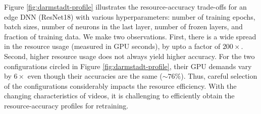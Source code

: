 Figure \ref{fig:darmstadt-profile} illustrates the resource-accuracy trade-offs for an edge DNN (ResNet18) with various hyperparameters: number of training epochs, batch sizes, number of neurons in the last layer, number of frozen layers, and fraction of training data. We make two observations.
First, there is a wide spread in the resource usage (measured in GPU seconds), by upto a factor of $200\times$. 
Second, higher resource usage does not always yield higher accuracy. For the two configurations circled in Figure \ref{fig:darmstadt-profile}, their GPU demands vary by $6\times$ even though their accuracies are the same ($\sim 76\%$). Thus, careful selection of the configurations considerably impacts the resource efficiency.
With the changing characteristics of videos, it is challenging to efficiently obtain the resource-accuracy profiles for retraining.



